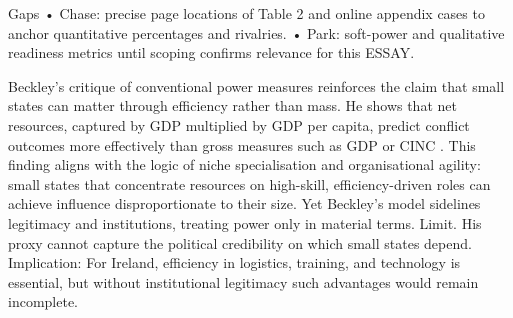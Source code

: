 Gaps
• Chase: precise page locations of Table 2 and online appendix cases to anchor quantitative percentages and rivalries.
• Park: soft-power and qualitative readiness metrics until scoping confirms relevance for this ESSAY.

Beckley’s critique of conventional power measures reinforces the claim that small states can matter through efficiency rather than mass. He shows that net resources, captured by GDP multiplied by GDP per capita, predict conflict outcomes more effectively than gross measures such as GDP or CINC \parencite{BECKLEY_2018}. This finding aligns with the logic of niche specialisation and organisational agility: small states that concentrate resources on high-skill, efficiency-driven roles can achieve influence disproportionate to their size. Yet Beckley’s model sidelines legitimacy and institutions, treating power only in material terms. Limit. His proxy cannot capture the political credibility on which small states depend. Implication: For Ireland, efficiency in logistics, training, and technology is essential, but without institutional legitimacy such advantages would remain incomplete.